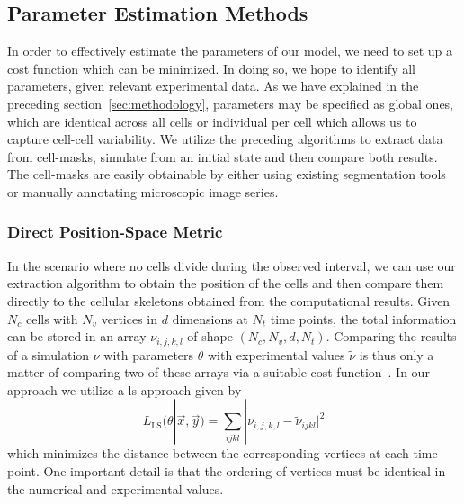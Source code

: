 \subsection{Parameter Estimation Methods}
\label{section:parameter-estimation}
In order to effectively estimate the parameters of our model, we need to set up a cost function
which can be minimized.
In doing so, we hope to identify all parameters, given relevant experimental data.
As we have explained in the preceding section~\ref{sec:methodology}, parameters may
be specified as
global ones, which are identical across all cells or individual per cell which allows
us to capture
cell-cell variability.
We utilize the preceding algorithms to extract data from cell-masks, simulate from an
initial state
and then compare both results.
The cell-masks are easily obtainable by either using existing segmentation
tools~\cite{Cutler2022,Stringer2020,Hardo2022} or manually annotating microscopic image series.

\subsubsection{Direct Position-Space Metric}
\label{subsec:direct-metric}
In the scenario where no cells divide during the observed interval, we can use our extraction
algorithm to obtain the position of the cells and then compare them directly to the cellular
skeletons obtained from the computational results.
Given $N_c$ cells with $N_v$ vertices in $d$ dimensions at $N_t$ time points, the
total information
can be stored in an array $\nu_{i,j,k,l}$ of shape $(N_c,N_v,d,N_t)$.
Comparing the results of a simulation $\nu$ with parameters $\theta$ with experimental values
$\tilde{\nu}$ is thus only a matter of comparing two of these arrays via a suitable cost
function~\cite{Wang2020}.
In our approach we utilize a \ac{ls} approach given by
\begin{equation}
    L_{\text{LS}}(\theta|\vec{x}, \vec{y})
    = \sum\limits_{ijkl}|\nu_{i,j,k,l} - \tilde{\nu}_{ijkl}|^2
\end{equation}
which minimizes the distance between the corresponding vertices at each time point.
One important detail is that the ordering of vertices must be identical in the numerical and
experimental values.

